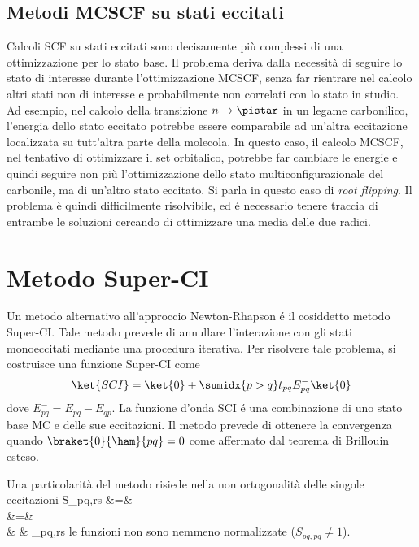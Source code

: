 \subsection{Metodi MCSCF su stati eccitati}

Calcoli SCF su stati eccitati sono decisamente pi\`u complessi di una
ottimizzazione per lo stato base. Il problema deriva dalla necessit\`a di
seguire lo stato di interesse durante l'ottimizzazione MCSCF, senza far
rientrare nel calcolo altri stati non di interesse e probabilmente non
correlati con lo stato in studio. Ad esempio, nel calcolo della
transizione $n \rightarrow \pistar$ in un legame carbonilico, l'energia
dello stato eccitato potrebbe essere comparabile ad un'altra eccitazione
localizzata su tutt'altra parte della molecola. In questo caso, il
calcolo MCSCF, nel tentativo di ottimizzare il set orbitalico, potrebbe
far cambiare le energie e quindi seguire non pi\`u l'ottimizzazione dello
stato multiconfigurazionale del carbonile, ma di un'altro stato
eccitato. Si parla in questo caso di \textit{root flipping}. Il problema 
\`e quindi difficilmente risolvibile, ed \'e necessario tenere traccia di entrambe 
le soluzioni cercando di ottimizzare una media delle due radici.

\section{Metodo Super-CI}
Un metodo alternativo all'approccio Newton-Rhapson \'e il cosiddetto
metodo Super-CI.
Tale metodo prevede di annullare l'interazione con gli stati
monoeccitati mediante una procedura iterativa.
Per risolvere tale problema, si costruisce una funzione Super-CI come
$$
\ket{SCI} = \ket{0} + \sumidx{p>q}t_{pq}E_{pq}^-\ket{0}
$$
dove $E_{pq}^- = E_{pq} - E_{qp}$.
La funzione d'onda SCI \'e una combinazione di uno stato base MC e delle
sue eccitazioni. Il metodo prevede di ottenere la convergenza quando
$\braket{0}{\ham}{pq} = 0$ come affermato dal teorema di Brillouin
esteso.

Una particolarit\`a del metodo risiede nella non ortogonalit\`a delle
singole eccitazioni
\beqas
S_{pq,rs} &=&  \\
&=&  \\
& \neq & \delta_{pq,rs}
\eeqas
le funzioni non sono nemmeno normalizzate ($S_{pq,pq} \neq 1$).

